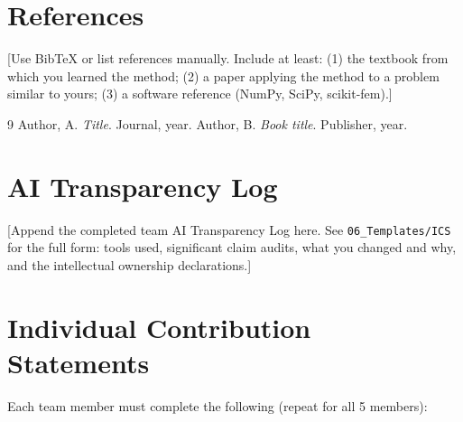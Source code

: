 \documentclass[11pt,a4paper]{article}
\theoremstyle{definition}
\theoremstyle{remark}
\begin{document}
\newpage
\section*{References}

[Use BibTeX or list references manually. Include at least: (1) the textbook from
which you learned the method; (2) a paper applying the method to a problem
similar to yours; (3) a software reference (NumPy, SciPy, scikit-fem).]

\begin{thebibliography}{9}
 Author, A. \emph{Title}. Journal, year.
 Author, B. \emph{Book title}. Publisher, year.
\end{thebibliography}

\newpage
\appendix
\section{AI Transparency Log}

[Append the completed team AI Transparency Log here. See
\texttt{06\_Templates/ICS} for the full form: tools used, significant claim audits,
what you changed and why, and the intellectual ownership declarations.]

\section{Individual Contribution Statements}

Each team member must complete the following (repeat for all 5 members):
\end{document}
